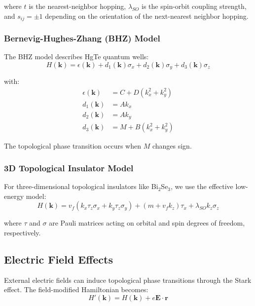 \documentclass[12pt,a4paper]{article}
\begin{document}
where $t$ is the nearest-neighbor hopping, $\lambda_{SO}$ is the spin-orbit coupling strength, and $s_{ij} = \pm 1$ depending on the orientation of the next-nearest neighbor hopping.

\subsubsection{Bernevig-Hughes-Zhang (BHZ) Model}

The BHZ model describes HgTe quantum wells:
\begin{equation}
H(\mathbf{k}) = \epsilon(\mathbf{k}) + d_1(\mathbf{k})\sigma_x + d_2(\mathbf{k})\sigma_y + d_3(\mathbf{k})\sigma_z
\end{equation}

with:
\begin{align}
\epsilon(\mathbf{k}) &= C + D(k_x^2 + k_y^2) \\
d_1(\mathbf{k}) &= A k_x \\
d_2(\mathbf{k}) &= A k_y \\
d_3(\mathbf{k}) &= M + B(k_x^2 + k_y^2)
\end{align}

The topological phase transition occurs when $M$ changes sign.

\subsubsection{3D Topological Insulator Model}

For three-dimensional topological insulators like Bi$_2$Se$_3$, we use the effective low-energy model:
\begin{equation}
H(\mathbf{k}) = v_f(k_x \tau_z \sigma_x + k_y \tau_z \sigma_y) + (m + v_f k_z)\tau_x + \lambda_{SO} k_z \sigma_z
\end{equation}

where $\tau$ and $\sigma$ are Pauli matrices acting on orbital and spin degrees of freedom, respectively.

\subsection{Electric Field Effects}

External electric fields can induce topological phase transitions through the Stark effect. The field-modified Hamiltonian becomes:
\begin{equation}
H'(\mathbf{k}) = H(\mathbf{k}) + e\mathbf{E} \cdot \mathbf{r}
\end{equation}
\end{document}
